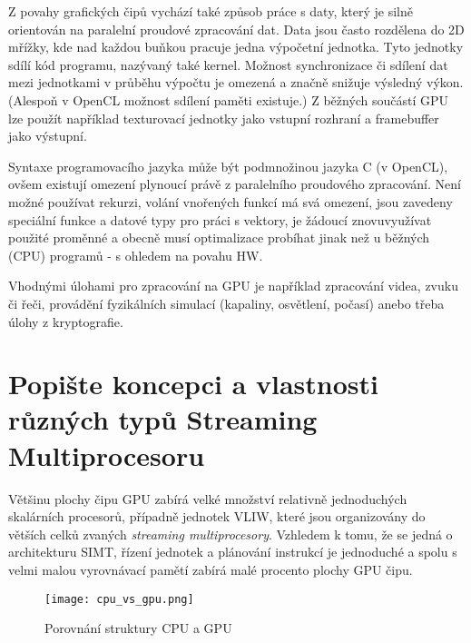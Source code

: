 	Z povahy grafických čipů vychází také způsob práce s daty, který je silně orientován na paralelní proudové zpracování dat. Data jsou často rozdělena do 2D mřížky, kde nad každou buňkou pracuje jedna výpočetní jednotka. Tyto jednotky sdílí kód programu, nazývaný také kernel. Možnost synchronizace či sdílení dat mezi jednotkami v průběhu výpočtu je omezená a značně snižuje výsledný výkon. (Alespoň v OpenCL možnost sdílení paměti existuje.) Z běžných součástí GPU lze použít například texturovací jednotky jako vstupní rozhraní a framebuffer jako výstupní.
	
	Syntaxe programovacího jazyka může být podmnožinou jazyka C (v OpenCL), ovšem existují omezení plynoucí právě z paralelního proudového zpracování. Není možné používat rekurzi, volání vnořených funkcí má svá omezení, jsou zavedeny speciální funkce a datové typy pro práci s vektory, je žádoucí znovuvyužívat použité proměnné a obecně musí optimalizace probíhat jinak než u běžných (CPU) programů - s ohledem na povahu HW.
	
	Vhodnými úlohami pro zpracování na GPU je například zpracování videa, zvuku či řeči, provádění fyzikálních simulací (kapaliny, osvětlení, počasí) anebo třeba úlohy z kryptografie.


\section{Popište koncepci a vlastnosti různých typů Streaming Multiprocesoru}
	Většinu plochy čipu GPU zabírá velké množství relativně jednoduchých skalárních procesorů, případně jednotek VLIW, které jsou organizovány do větších celků zvaných \emph{streaming multiprocesory}.
	Vzhledem k tomu, že se jedná o architekturu SIMT, řízení jednotek a plánování instrukcí je jednoduché a spolu s velmi malou vyrovnávací pamětí zabírá malé procento plochy GPU čipu.
	\begin{figure}[h!]
		\centering
		\texttt{[image: cpu\_vs\_gpu.png]}
		\caption{Porovnání struktury CPU a GPU}
		\label{fig:cpu_vs_gpu}
	\end{figure}
	
	
